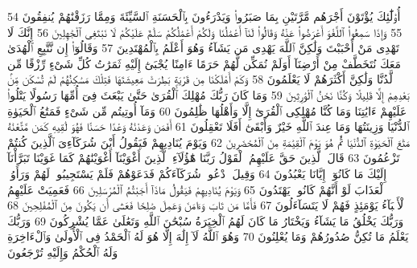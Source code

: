 {\tiny\colorbox{cl_aya}{54}} أُو۟لَٰٓئِكَ يُؤْتَوْنَ أَجْرَهُم مَّرَّتَيْنِ بِمَا صَبَرُوا۟ وَيَدْرَءُونَ بِٱلْحَسَنَةِ ٱلسَّيِّئَةَ وَمِمَّا رَزَقْنَٰهُمْ يُنفِقُونَ
{\tiny\colorbox{cl_aya}{55}} وَإِذَا سَمِعُوا۟ ٱللَّغْوَ أَعْرَضُوا۟ عَنْهُ وَقَالُوا۟ لَنَآ أَعْمَٰلُنَا وَلَكُمْ أَعْمَٰلُكُمْ سَلَٰمٌ عَلَيْكُمْ لَا نَبْتَغِى ٱلْجَٰهِلِينَ
{\tiny\colorbox{cl_aya}{56}} إِنَّكَ لَا تَهْدِى مَنْ أَحْبَبْتَ وَلَٰكِنَّ ٱللَّهَ يَهْدِى مَن يَشَآءُ وَهُوَ أَعْلَمُ بِٱلْمُهْتَدِينَ
{\tiny\colorbox{cl_aya}{57}} وَقَالُوٓا۟ إِن نَّتَّبِعِ ٱلْهُدَىٰ مَعَكَ نُتَخَطَّفْ مِنْ أَرْضِنَآ أَوَلَمْ نُمَكِّن لَّهُمْ حَرَمًا ءَامِنًا يُجْبَىٰٓ إِلَيْهِ ثَمَرَٰتُ كُلِّ شَىْءٍ رِّزْقًا مِّن لَّدُنَّا وَلَٰكِنَّ أَكْثَرَهُمْ لَا يَعْلَمُونَ
{\tiny\colorbox{cl_aya}{58}} وَكَمْ أَهْلَكْنَا مِن قَرْيَةٍۭ بَطِرَتْ مَعِيشَتَهَا فَتِلْكَ مَسَٰكِنُهُمْ لَمْ تُسْكَن مِّنۢ بَعْدِهِمْ إِلَّا قَلِيلًا وَكُنَّا نَحْنُ ٱلْوَٰرِثِينَ
{\tiny\colorbox{cl_aya}{59}} وَمَا كَانَ رَبُّكَ مُهْلِكَ ٱلْقُرَىٰ حَتَّىٰ يَبْعَثَ فِىٓ أُمِّهَا رَسُولًا يَتْلُوا۟ عَلَيْهِمْ ءَايَٰتِنَا وَمَا كُنَّا مُهْلِكِى ٱلْقُرَىٰٓ إِلَّا وَأَهْلُهَا ظَٰلِمُونَ
{\tiny\colorbox{cl_aya}{60}} وَمَآ أُوتِيتُم مِّن شَىْءٍ فَمَتَٰعُ ٱلْحَيَوٰةِ ٱلدُّنْيَا وَزِينَتُهَا وَمَا عِندَ ٱللَّهِ خَيْرٌ وَأَبْقَىٰٓ أَفَلَا تَعْقِلُونَ
{\tiny\colorbox{cl_aya}{61}} أَفَمَن وَعَدْنَٰهُ وَعْدًا حَسَنًا فَهُوَ لَٰقِيهِ كَمَن مَّتَّعْنَٰهُ مَتَٰعَ ٱلْحَيَوٰةِ ٱلدُّنْيَا ثُمَّ هُوَ يَوْمَ ٱلْقِيَٰمَةِ مِنَ ٱلْمُحْضَرِينَ
{\tiny\colorbox{cl_aya}{62}} وَيَوْمَ يُنَادِيهِمْ فَيَقُولُ أَيْنَ شُرَكَآءِىَ ٱلَّذِينَ كُنتُمْ تَزْعُمُونَ
{\tiny\colorbox{cl_aya}{63}} قَالَ ٱلَّذِينَ حَقَّ عَلَيْهِمُ ٱلْقَوْلُ رَبَّنَا هَٰٓؤُلَآءِ ٱلَّذِينَ أَغْوَيْنَآ أَغْوَيْنَٰهُمْ كَمَا غَوَيْنَا تَبَرَّأْنَآ إِلَيْكَ مَا كَانُوٓا۟ إِيَّانَا يَعْبُدُونَ
{\tiny\colorbox{cl_aya}{64}} وَقِيلَ ٱدْعُوا۟ شُرَكَآءَكُمْ فَدَعَوْهُمْ فَلَمْ يَسْتَجِيبُوا۟ لَهُمْ وَرَأَوُا۟ ٱلْعَذَابَ لَوْ أَنَّهُمْ كَانُوا۟ يَهْتَدُونَ
{\tiny\colorbox{cl_aya}{65}} وَيَوْمَ يُنَادِيهِمْ فَيَقُولُ مَاذَآ أَجَبْتُمُ ٱلْمُرْسَلِينَ
{\tiny\colorbox{cl_aya}{66}} فَعَمِيَتْ عَلَيْهِمُ ٱلْأَنۢبَآءُ يَوْمَئِذٍ فَهُمْ لَا يَتَسَآءَلُونَ
{\tiny\colorbox{cl_aya}{67}} فَأَمَّا مَن تَابَ وَءَامَنَ وَعَمِلَ صَٰلِحًا فَعَسَىٰٓ أَن يَكُونَ مِنَ ٱلْمُفْلِحِينَ
{\tiny\colorbox{cl_aya}{68}} وَرَبُّكَ يَخْلُقُ مَا يَشَآءُ وَيَخْتَارُ مَا كَانَ لَهُمُ ٱلْخِيَرَةُ سُبْحَٰنَ ٱللَّهِ وَتَعَٰلَىٰ عَمَّا يُشْرِكُونَ
{\tiny\colorbox{cl_aya}{69}} وَرَبُّكَ يَعْلَمُ مَا تُكِنُّ صُدُورُهُمْ وَمَا يُعْلِنُونَ
{\tiny\colorbox{cl_aya}{70}} وَهُوَ ٱللَّهُ لَآ إِلَٰهَ إِلَّا هُوَ لَهُ ٱلْحَمْدُ فِى ٱلْأُولَىٰ وَٱلْءَاخِرَةِ وَلَهُ ٱلْحُكْمُ وَإِلَيْهِ تُرْجَعُونَ
